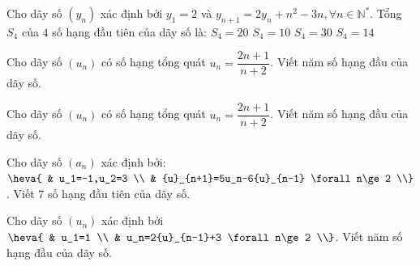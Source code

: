 \begin{ex}%
	Cho dãy số $\left(y_n\right)$ xác định bởi $y_1=2$ và ${y}_{n+1}=2y_n+n^2-3n,\forall n\in \mathbb{N}^*$. Tổng $S_4$ của $4$  số hạng đầu tiên của dãy số là:
	 \choice
		 {\True $S_4=20$}
		 {$S_4=10$}
		{$S_4=30$} 
		{$S_4=14$} 
\end{ex}

\begin{bt}%
	Cho dãy số $(u_n)$ có  số hạng tổng quát $u_n=\dfrac{2n+1}{n+2}$. Viết năm số hạng đầu của dãy số.
\end{bt}

\begin{ex}%
	Cho dãy số $(u_n)$ có số hạng tổng quát $u_n=\dfrac{2n+1}{n+2}$. Viết  năm số hạng đầu của dãy số.
\end{ex}

\begin{ex}%
	Cho dãy số $(a_n)$  xác định bởi: $\heva{
	& u_1=-1,u_2=3 \\ 
	& {u}_{n+1}=5u_n-6{u}_{n-1} \forall n\ge 2 \\}$. Viết 7 số hạng đầu tiên của  dãy số.
\end{ex}

\begin{ex}%
	Cho  dãy số $(u_n)$ xác định bởi $\heva{
	 & u_1=1 \\
	& u_n=2{u}_{n-1}+3 \forall n\ge 2 \\}$. Viết năm số hạng đầu của  dãy số.
\end{ex}

